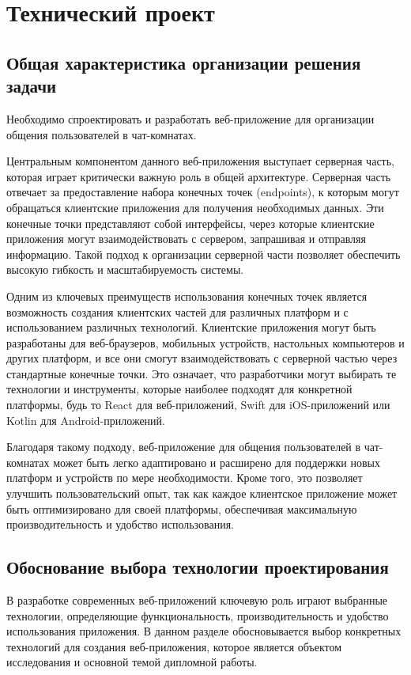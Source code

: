 \section{Технический проект}
\subsection{Общая характеристика организации решения задачи}

Необходимо спроектировать и разработать веб-приложение для организации общения пользователей в чат-комнатах.

Центральным компонентом данного веб-приложения выступает серверная часть, которая играет критически важную роль в общей архитектуре. Серверная часть отвечает за предоставление набора конечных точек (endpoints), к которым могут обращаться клиентские приложения для получения необходимых данных. Эти конечные точки представляют собой интерфейсы, через которые клиентские приложения могут взаимодействовать с сервером, запрашивая и отправляя информацию. Такой подход к организации серверной части позволяет обеспечить высокую гибкость и масштабируемость системы.

Одним из ключевых преимуществ использования конечных точек является возможность создания клиентских частей для различных платформ и с использованием различных технологий. Клиентские приложения могут быть разработаны для веб-браузеров, мобильных устройств, настольных компьютеров и других платформ, и все они смогут взаимодействовать с серверной частью через стандартные конечные точки. Это означает, что разработчики могут выбирать те технологии и инструменты, которые наиболее подходят для конкретной платформы, будь то React для веб-приложений, Swift для iOS-приложений или Kotlin для Android-приложений.

Благодаря такому подходу, веб-приложение для общения пользователей в чат-комнатах может быть легко адаптировано и расширено для поддержки новых платформ и устройств по мере необходимости. Кроме того, это позволяет улучшить пользовательский опыт, так как каждое клиентское приложение может быть оптимизировано для своей платформы, обеспечивая максимальную производительность и удобство использования.

\subsection{Обоснование выбора технологии проектирования}

В разработке современных веб-приложений ключевую роль играют выбранные технологии, определяющие функциональность, производительность и удобство использования приложения. В данном разделе обосновывается выбор конкретных технологий для создания веб-приложения, которое является объектом исследования и основной темой дипломной работы.

